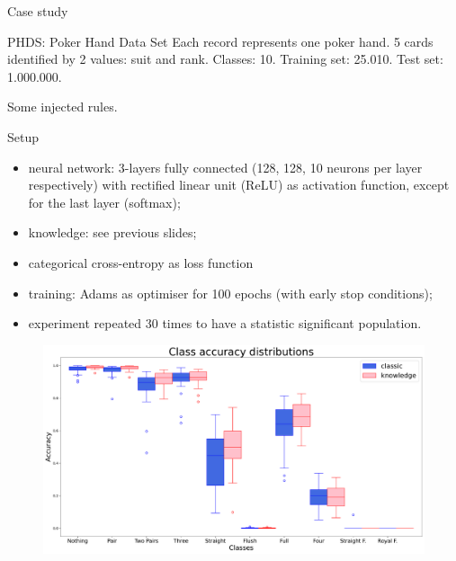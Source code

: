 \documentclass[presentation]{beamer}\mode<presentation>{\usetheme{AMSBolognaFC}}
\begin{document}
\begin{frame}[allowframebreaks]{Case study}
    
    \begin{block}{PHDS: Poker Hand Data Set}
        Each record represents one poker hand. 5 cards identified by 2 values: suit and rank.
        Classes: 10.
        Training set: 25.010. Test set: 1.000.000.
    \end{block}
    
    
    
    \framebreak
    
    Some injected rules.
    
    
    \framebreak
    
    \begin{block}{Setup}
        \begin{itemize}
            \item neural network: 3-layers fully connected (128, 128, 10 neurons per layer respectively) with rectified linear unit (ReLU) as activation function, except for the last layer (softmax);
            \item knowledge: see previous slides;
            \item categorical cross-entropy as loss function
            \item training: Adams as optimiser for 100 epochs (with early stop conditions);
            \item experiment repeated 30 times to have a statistic significant population.
        \end{itemize}
    \end{block}
    
    \framebreak
    
    
    
    \framebreak
    
    \begin{figure}
        \centering
        \includegraphics[width=.8\linewidth]{figures/class-accuracy-distributions.pdf}
    \end{figure}
    
\end{frame}
\end{document}
